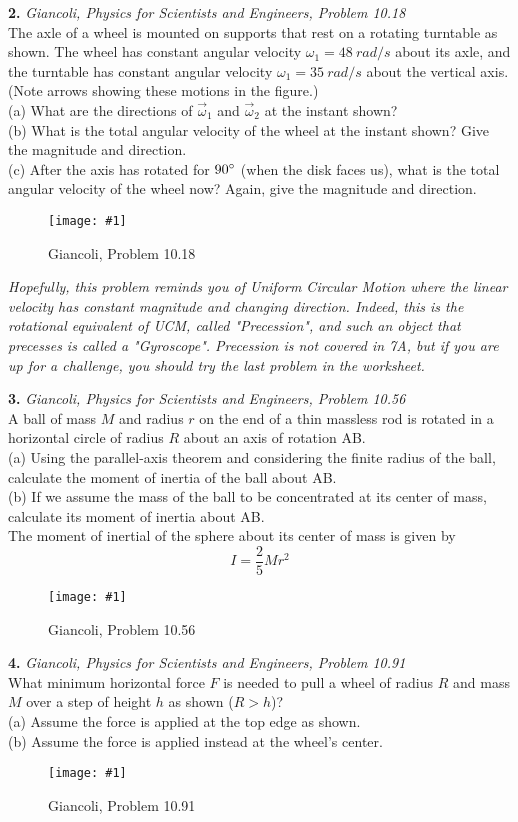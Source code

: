 \documentclass[11pt]{article}
\newcommand{\fig}[4]{
    \begin{figure}[H]
        \centering
        \texttt{[image: \#1]}
        \caption{#2}
        \label{exp4fit}
    \end{figure}
}
\theoremstyle{gangnamstyle}{\newtheorem{definition}{Definition}[]}
\theoremstyle{gangnamstyle}{\newtheorem{example}{Example}[]}
\theoremstyle{gangnamstyle}{\newtheorem{problem}{Problem}[]}
\begin{document}
\pagebreak

\textbf{2.} \textit{Giancoli, Physics for Scientists and Engineers, Problem 10.18} \\
The axle of a wheel is mounted on supports that rest on a rotating turntable as shown. The wheel has constant angular velocity $\omega_1 = 48 \ rad/s$ about its axle, and the turntable has constant angular velocity $\omega_1 = 35 \ rad/s$ about the vertical axis. (Note arrows showing these motions in the figure.) \\
(a) What are the directions of $\Vec{\omega}_1$ and $\Vec{\omega}_2$ at the instant shown? \\
(b) What is the total angular velocity of the wheel at the instant shown? Give the magnitude and direction. \\
(c) After the axis has rotated for $90 \degree$ (when the disk faces us), what is the total angular velocity of the wheel now? Again, give the magnitude and direction. 
\fig{figs/0718/g1018.png}{Giancoli, Problem 10.18}{0.6}{0}
\textit{Hopefully, this problem reminds you of Uniform Circular Motion where the linear velocity has constant magnitude and changing direction. Indeed, this is the rotational equivalent of UCM, called "Precession", and such an object that precesses is called a "Gyroscope". Precession is not covered in 7A, but if you are up for a challenge, you should try the last problem in the worksheet.}

\pagebreak

\textbf{3.} \textit{Giancoli, Physics for Scientists and Engineers, Problem 10.56} \\
A ball of mass $M$ and radius $r$ on the end of a thin massless rod is rotated in a horizontal circle of radius $R$ about an axis of rotation AB. \\
(a) Using the parallel-axis theorem and considering the finite radius of the ball, calculate the moment of inertia of the ball about AB. \\
(b) If we assume the mass of the ball to be concentrated at its center of mass, calculate its moment of inertia about AB. \\
The moment of inertial of the sphere about its center of mass is given by
\[ I = \frac{2}{5} Mr^2 \]
\fig{figs/0718/g56.png}{Giancoli, Problem 10.56}{0.6}{0}

\pagebreak

\textbf{4.} \textit{Giancoli, Physics for Scientists and Engineers, Problem 10.91} \\
What minimum horizontal force $F$ is needed to pull a wheel of radius $R$ and mass $M$ over a step of height $h$ as shown ($R > h$)? \\
(a) Assume the force is applied at the top edge as shown. \\
(b) Assume the force is applied instead at the wheel’s center.
\fig{figs/0718/g91.png}{Giancoli, Problem 10.91}{0.6}{0}
\end{document}
